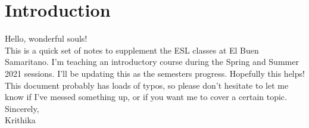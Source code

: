 \chapter{Introduction}

Hello, wonderful souls! \\

This is a quick set of notes to supplement
the ESL classes at El Buen Samaritano.
I'm teaching an introductory course during the
Spring and Summer 2021 sessions.
I'll be updating this as the semesters progress.
Hopefully this helps! \\

This document probably has loads of typos,
so please don't hesitate to let me know if I've
messed something up, or if you want me to
cover a certain topic.\\

Sincerely,\\
Krithika
